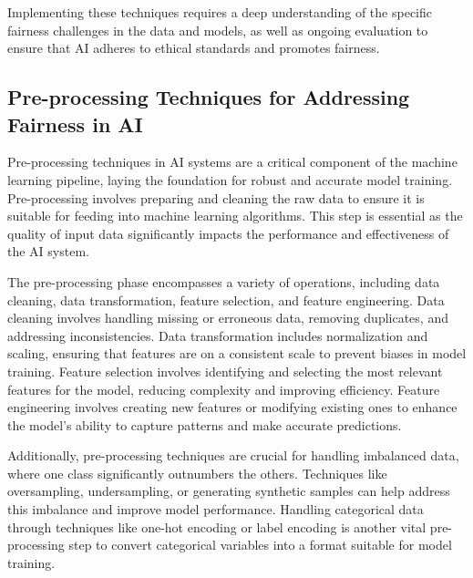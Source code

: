 \documentclass[12pt,a4paper,openright,twoside]{book}
\begin{document}
Implementing these techniques requires a deep understanding of the specific fairness challenges in the data and models, as well as ongoing evaluation to ensure that AI adheres to ethical standards and promotes fairness. \cite{10.1145/3616865}

\subsection{Pre-processing Techniques for Addressing Fairness in AI}

Pre-processing techniques in AI systems are a critical component of the machine learning pipeline, laying the foundation for robust and accurate model training. Pre-processing involves preparing and cleaning the raw data to ensure it is suitable for feeding into machine learning algorithms. This step is essential as the quality of input data significantly impacts the performance and effectiveness of the AI system.

The pre-processing phase encompasses a variety of operations, including data cleaning, data transformation, feature selection, and feature engineering. Data cleaning involves handling missing or erroneous data, removing duplicates, and addressing inconsistencies. Data transformation includes normalization and scaling, ensuring that features are on a consistent scale to prevent biases in model training. Feature selection involves identifying and selecting the most relevant features for the model, reducing complexity and improving efficiency. Feature engineering involves creating new features or modifying existing ones to enhance the model's ability to capture patterns and make accurate predictions.

Additionally, pre-processing techniques are crucial for handling imbalanced data, where one class significantly outnumbers the others. Techniques like oversampling, undersampling, or generating synthetic samples can help address this imbalance and improve model performance. Handling categorical data through techniques like one-hot encoding or label encoding is another vital pre-processing step to convert categorical variables into a format suitable for model training.
\end{document}
